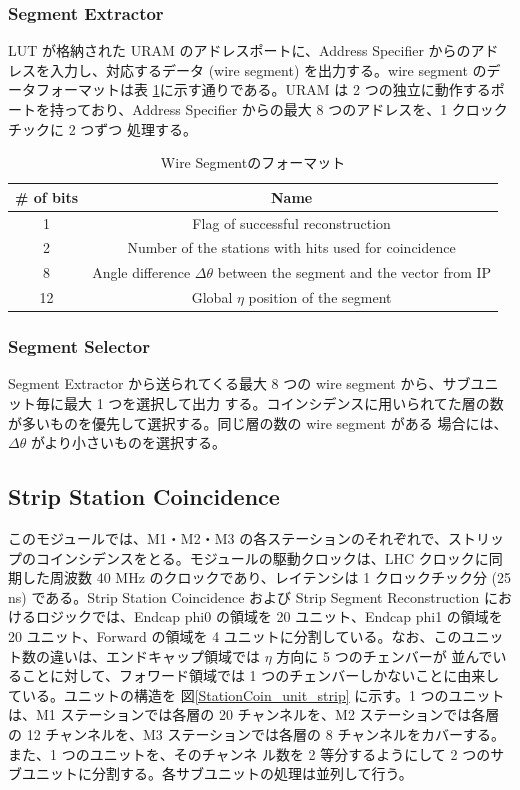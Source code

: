 \subsubsection*{Segment Extractor}
LUT が格納された URAM のアドレスポートに、Address Specifier からのアドレスを入力し、対応するデータ
(wire segment) を出力する。wire segment のデータフォーマットは表 \ref{tab:WireSegment}に示す通りである。URAM は 2 つの独立に動作するポートを持っており、Address Specifier からの最大 8 つのアドレスを、1 クロックチックに 2 つずつ 処理する。

\begin{table}[h]
    \centering
    \caption{Wire Segmentのフォーマット}
    \label{tab:WireSegment}
    \begin{tabular}{|c|c|}
    \hline
    \# of bits & Name                                                                       \\ \hline\hline
    1          & Flag of successful reconstruction                                          \\ \hline
    2          & Number of the stations with hits used for coincidence                      \\ \hline
    8          & Angle difference $\Delta\theta$ between the segment and the vector from IP \\ \hline
    12         & Global $\eta$ position of the segment                                      \\ \hline
    \end{tabular}
\end{table}

\subsubsection{Segment Selector}
Segment Extractor から送られてくる最大 8 つの wire segment から、サブユニット毎に最大 1 つを選択して出力
する。コインシデンスに用いられてた層の数が多いものを優先して選択する。同じ層の数の wire segment がある 場合には、$\Delta\theta$ がより小さいものを選択する。

\subsection*{Strip Station Coincidence}
このモジュールでは、M1・M2・M3 の各ステーションのそれぞれで、ストリップのコインシデンスをとる。モジュールの駆動クロックは、LHC クロックに同期した周波数 40 MHz のクロックであり、レイテンシは 1 クロックチック分 (25 ns) である。Strip Station Coincidence および Strip Segment Reconstruction におけるロジックでは、Endcap phi0 の領域を 20 ユニット、Endcap phi1 の領域を 20 ユニット、Forward の領域を 4 ユニットに分割している。なお、このユニット数の違いは、エンドキャップ領域では $\eta$ 方向に 5 つのチェンバーが 並んでいることに対して、フォワード領域では 1 つのチェンバーしかないことに由来している。ユニットの構造を
図\ref{StationCoin_unit_strip}  に示す。1 つのユニットは、M1 ステーションでは各層の 20 チャンネルを、M2 ステーションでは各層の 12 チャンネルを、M3 ステーションでは各層の 8 チャンネルをカバーする。また、1 つのユニットを、そのチャンネ ル数を 2 等分するようにして 2 つのサブユニットに分割する。各サブユニットの処理は並列して行う。

